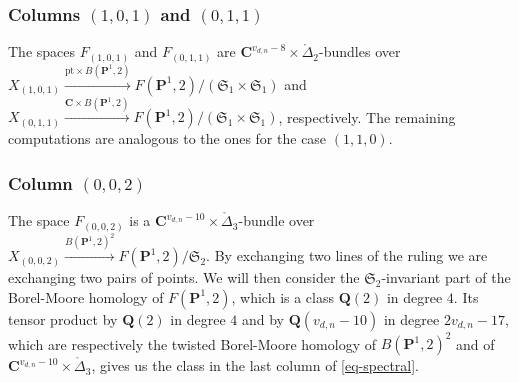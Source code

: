 \documentclass[10pt,a4paper,twoside]{amsart}
\theoremstyle{plain}
\theoremstyle{definition}
\theoremstyle{remark}
\begin{document}
\subsubsection*{Columns $(1,0,1)$ and $(0,1,1)$}
The spaces $F_{(1,0,1)}$ and $F_{(0,1,1)}$ are $\mathbf{C}^{v_{d,n}-8}\times\mathring{\Delta}_2\mbox{-}$bundles over $X_{(1,0,1)}\xrightarrow{ \mathrm{pt}\times{B(\mathbf{P}^1,2)}}F(\mathbf{P}^1,2)/(\mathfrak{S}_1\times \mathfrak{S}_1)$ and $X_{(0,1,1)}\xrightarrow{\mathbf{C}\times B(\mathbf{P}^1,2)}F(\mathbf{P}^1,2)/(\mathfrak{S}_1\times \mathfrak{S}_1)$, respectively.
The remaining computations are analogous to the ones for the case $(1,1,0).$

\subsubsection*{Column $(0,0,2)$}
The space $F_{(0,0,2)}$ is a $\mathbf{C}^{v_{d,n}-10}\times\mathring{\Delta}_3\mbox{-}$bundle over $X_{(0,0,2)}\xrightarrow{B(\mathbf{P}^1,2)^2}F(\mathbf{P}^1,2)/\mathfrak{S}_2.$
By exchanging two lines of the ruling we are exchanging two pairs of points. We will then consider the $\mathfrak{S}_2\mbox{-}$invariant part of the Borel-Moore homology of $F(\mathbf{P}^1,2)$, which is a class $\mathbf{Q} (2)$ in degree $4$. Its tensor product by $\mathbf{Q}(2)$ in degree $4$ and by $\mathbf{Q}(v_{d,n}-10)$ in degree $2v_{d,n}-17$, which are respectively the twisted Borel-Moore homology of $B(\mathbf{P}^1,2)^2$ and of $\mathbf{C}^{v_{d,n}-10}\times\mathring{\Delta}_3$, gives us the class in the last column of \eqref{eq-spectral}.\
\end{document}
